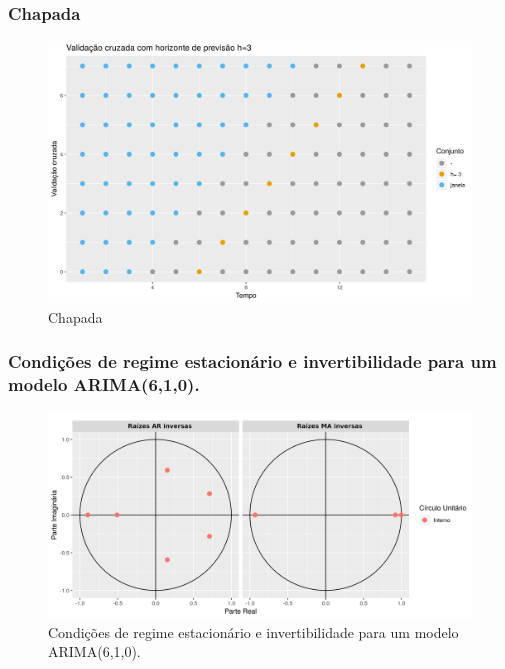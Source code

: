 \documentclass{beamer}
\begin{document}
\begin{frame}
	\frametitle{Chapada}
	\begin{figure}
		\centering
		\includegraphics[width=\textwidth]{crossh3}
		\caption{Chapada}
	\end{figure}
\end{frame}

\begin{frame}
	\frametitle{Condições de regime estacionário e invertibilidade para um modelo ARIMA(6,1,0).}
	\begin{figure}
		\centering
		\includegraphics[width=\textwidth]{conds}
		\caption{Condições de regime estacionário e invertibilidade para um modelo ARIMA(6,1,0).}
	\end{figure}
\end{frame}
\end{document}
